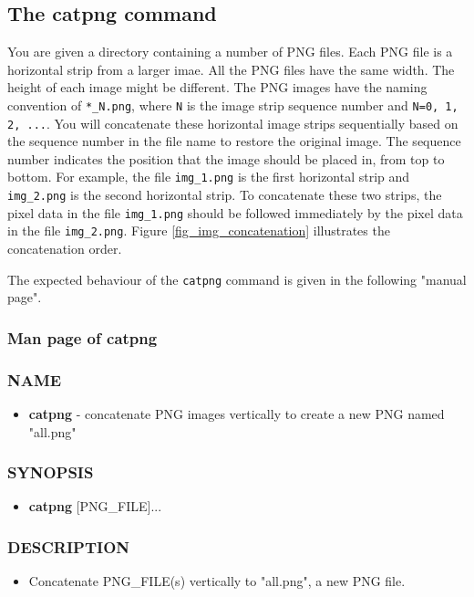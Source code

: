 \subsection{The catpng command}
You are given a directory containing a number of PNG files. Each PNG file is a horizontal strip from a larger imae.
All the PNG files have the same width. The height of each image might be different. The PNG images have the naming convention of \verb+*_N.png+, where \verb+N+ is the image strip sequence number and \verb+N=0, 1, 2, ...+.  You will concatenate these horizontal image strips sequentially based on the sequence number in the file name to restore the original image. The sequence number indicates the position that the image should be placed in, from top to bottom. For example, the file \verb+img_1.png+ is the first horizontal strip and \verb+img_2.png+ is the second horizontal strip. To concatenate these two strips, the pixel data in the file \verb+img_1.png+ should be followed immediately by the pixel data in the file \verb+img_2.png+. Figure \ref{fig_img_concatenation} illustrates the concatenation order.

The expected behaviour of the \verb+catpng+ command is given in the following "manual page".
\subsubsection{Man page of catpng}
\subsubsection*{NAME}
  \begin{itemize}
    \item[]{\bf catpng} - concatenate PNG images vertically to create a new PNG named "all.png"
  \end{itemize}
\subsubsection*{SYNOPSIS}
  \begin{itemize}
    \item[]{\bf catpng} [PNG\_FILE]... 
  \end{itemize}
\subsubsection*{DESCRIPTION}
  \begin{itemize}
  \item[]Concatenate PNG\_FILE(s) vertically to "all.png", a new PNG file.
  \end{itemize}
